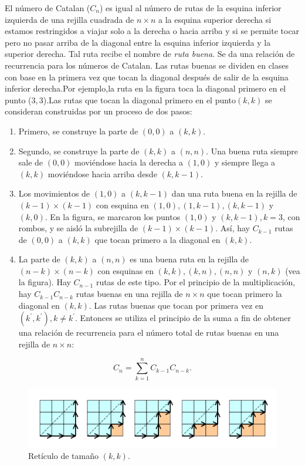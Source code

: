\begin{example}
	El número de Catalan ($C_{n} $) es igual al número de rutas de la esquina inferior izquierda de una rejilla cuadrada de $n\times n$ a la esquina superior derecha si estamos restringidos a viajar solo a la derecha o hacia arriba y si se permite tocar pero no pasar arriba de la diagonal entre la esquina inferior izquierda y la superior derecha. Tal ruta recibe el nombre de \emph{ruta buena}. Se da una relación de recurrencia para los números de Catalan. Las rutas buenas se dividen en clases con base en  la primera vez que tocan la diagonal después de salir de la esquina inferior derecha.Por ejemplo,la ruta en la figura toca la diagonal primero en el punto ($3,3$).Las rutas que tocan la diagonal primero en el punto$(k,k)$ se consideran construidas por un proceso de dos pasos:
	\begin{enumerate}
		\item Primero, se construye la parte de $(0,0)$ a $(k,k)$.
		\item Segundo, se construye la parte de $(k,k)$ a $(n,n)$. Una buena ruta siempre sale de $(0,0)$ moviéndose hacia la derecha a $(1,0)$ y siempre llega a $(k,k)$ moviéndose hacia arriba desde $(k,k-1)$.
		\item Los movimientos de $(1,0)$ a $(k,k-1)$ dan una ruta buena en la rejilla de $(k-1)\times(k-1) $ con esquina en $ (1,0),(1,k-1),(k,k-1)$ y $ (k,0)$. En la figura, se marcaron los puntos $(1,0)$ y $(k,k-1),k=3$, con rombos, y se aisló la subrejilla de $(k-1)\times(k-1)$. Así, hay $C_{k-1}$ rutas de $(0,0)$ a $(k,k)$ que tocan primero a la diagonal en $(k,k)$.
		\item La parte de $(k,k)$ a $(n,n)$ es una buena ruta en la rejilla de $(n-k)\times(n-k)$ con esquinas en $(k,k),(k,n),(n,n)$ y $(n,k)$ (vea la figura). Hay $C_{n-1}$ rutas de este tipo. Por el principio de la multiplicación, hay $C_{k-1}C_{n-k}$ rutas buenas en una rejilla de $n\times n$ que tocan primero la diagonal en $(k,k)$. Las rutas buenas que tocan por primera vez en $(k^{\prime}, k^{\prime}),k\neq k^{\prime}$. Entonces se utiliza el principio de la suma a fin de obtener una relación de recurrencia para el número total de rutas buenas en una rejilla de $n\times n$:
	\end{enumerate}
	\[ C_{n}=\sum_{k=1}^{n}C_{k-1}C_{n-k}. \]
	\begin{figure}[ht!]
		\sidecaption[t]%
		\centering
		\includegraphics[width=0.4\paperwidth]{./img/catalan.png}
		\caption{\label{fig:hanoi} Retículo de tamaño $\left(k,k\right)$.}
	\end{figure}
\end{example}


